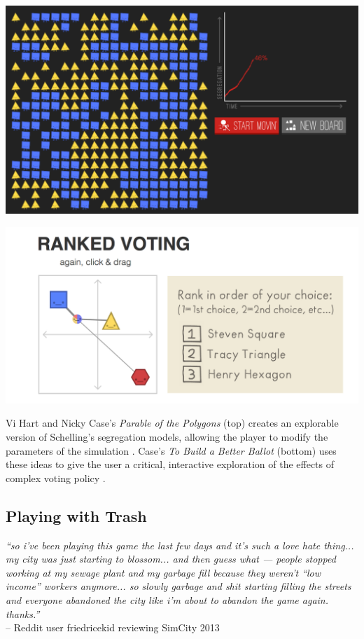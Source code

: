 \documentclass[nofonts,nols,justified,nobib]{tufte-book}
\begin{document}
\begin{marginfigure}
\includegraphics[width=\textwidth]{img/1/parable.png}

\vspace{0.2cm}

\includegraphics[width=\textwidth]{img/1/voting.png}
\caption{Vi Hart and Nicky Case's \emph{Parable of the Polygons} (top) creates an explorable version of Schelling's segregation models, allowing the player to modify the parameters of the simulation \cite{case_parable_2015}. Case's \emph{To Build a Better Ballot} (bottom) uses these ideas to give the user a critical, interactive exploration of the effects of complex voting policy \cite{case_build_2016}.}
\end{marginfigure}

\subsection*{Playing with Trash}

\begin{flushright}
\emph{``so i've been playing this game the last few days and it's such a love hate thing... my city was just starting to blossom... and then guess what --- people stopped working at my sewage plant and my garbage fill because they weren't ``low income'' workers anymore... so slowly garbage and shit starting filling the streets and everyone abandoned the city like i'm about to abandon the game again. thanks.''}\cite{friedricekid_is_2017}\\
-- Reddit user friedricekid reviewing SimCity 2013
\end{flushright}
\end{document}
